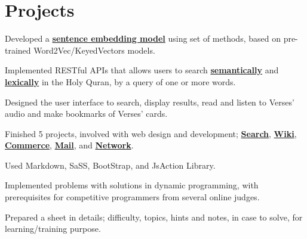 \documentclass[]{deedy-resume-openfont}
\begin{document}
\begin{minipage}[t]{0.66\textwidth}

\section{Projects}
\href{https://github.com/ahr9n/quranic-search-v2}{}
\begin{tightemize}
    \item Developed a \href{https://github.com/ahr9n/semantic-search-notebooks}{\textbf{sentence embedding model}} using set of methods, based on pre-trained Word2Vec/KeyedVectors models.\\
    \item Implemented RESTful APIs that allows users to search \href{https://github.com/ahr9n/quran-semantic-search-api}{\textbf{semantically}} and \href{https://github.com/ahr9n/quran-lexical-search-api}{\textbf{lexically}} in the Holy Quran, by a query of one or more words.\\
    \item Designed the user interface to search, display results, read and listen to Verses' audio and make bookmarks of Verses' cards.
\end{tightemize}
\sectionsep

\begin{tightemize}
    \item Finished 5 projects, involved with web design and development; \href{https://github.com/ahr9n/cs50w-search}{\textbf{Search}}, \href{https://github.com/ahr9n/cs50w-wiki}{\textbf{Wiki}}, \href{https://github.com/ahr9n/cs50w-commerce}{\textbf{Commerce}}, \href{https://github.com/ahr9n/cs50w-mail}{\textbf{Mail}}, and \href{https://github.com/ahr9n/cs50w-network}{\textbf{Network}}.
    \item Used Markdown, SaSS, BootStrap, and JsAction Library.
\end{tightemize}
\sectionsep

\href{https://github.com/ahr9n/psolving-paradigms}{}
\begin{tightemize}
    \item Implemented problems with solutions in dynamic programming, with prerequisites for competitive programmers from several online judges.
    \item Prepared a sheet in details; difficulty, topics, hints and notes, in case to solve, for learning/training purpose.
\end{tightemize}
\sectionsep


\end{minipage}
\end{document}
